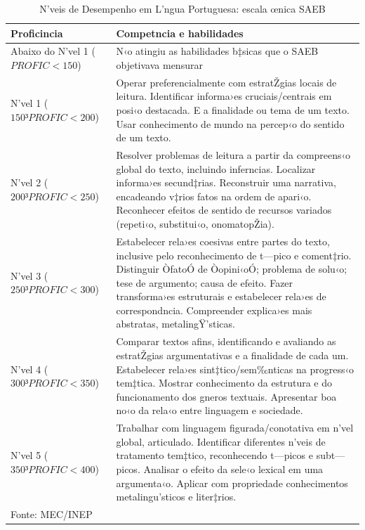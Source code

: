 \documentclass[a4paper, 12pt]{article}
\begin{document}


\begin{table}\centering
\begin{footnotesize}
\def\sym#1{\ifmmode^{#1}\else\(^{#1}\)\fi}
\caption{N’veis de Desempenho em L’ngua Portuguesa: escala œnica SAEB} 
\label{tab: tabsaeb}
\begin{tabular}{p{3cm} | p{9cm}}  
\toprule
\bf{Proficincia}   &  \bf{Competncia e habilidades}  \\
\midrule
\hline
Abaixo do N’vel 1 ($PROFIC < 150$) & N‹o atingiu as habilidades b‡sicas que o SAEB objetivava mensurar \\
\hline
N’vel 1 ($150 ³ PROFIC < 200$) &  Operar preferencialmente com estratŽgias locais de leitura. Identificar informa›es cruciais/centrais em posi‹o destacada. E a finalidade ou tema de um texto. Usar conhecimento de mundo na percep‹o do sentido de um texto. \\
\hline
N’vel 2 ($200 ³ PROFIC < 250$) & Resolver problemas de leitura a partir da compreens‹o global do texto, incluindo inferncias. Localizar informa›es secund‡rias. Reconstruir uma narrativa, encadeando v‡rios fatos na ordem de apari‹o. Reconhecer efeitos de sentido de recursos variados (repeti‹o, substitui‹o, onomatopŽia). \\
\hline
N’vel 3 ($250 ³ PROFIC < 300$) & Estabelecer rela›es coesivas entre partes do texto, inclusive pelo reconhecimento de t—pico e coment‡rio. Distinguir ÒfatoÓ de Òopini‹oÓ; problema de solu‹o; tese de argumento; causa de efeito. Fazer transforma›es estruturais e estabelecer rela›es de correspondncia. Compreender explica›es mais abstratas, metalingŸ’sticas.  \\
\hline
N’vel 4 ($300 ³ PROFIC < 350$) & Comparar textos afins, identificando e avaliando as estratŽgias argumentativas e a finalidade de cada um. Estabelecer rela›es sint‡tico/sem‰nticas na progress‹o tem‡tica. Mostrar conhecimento da estrutura e do funcionamento dos gneros textuais. Apresentar boa no‹o da rela‹o entre linguagem e sociedade. \\
\hline
N’vel 5 ($350 ³ PROFIC < 400$) & Trabalhar com linguagem figurada/conotativa em
n’vel global, articulado. Identificar diferentes n’veis de tratamento tem‡tico, reconhecendo t—picos e subt—picos. Analisar o efeito da sele‹o lexical em uma argumenta‹o. Aplicar com propriedade conhecimentos metalingu’sticos e liter‡rios.  \\
\hline
\bottomrule
\multicolumn{2}{l}{\footnotesize Fonte: MEC/INEP}\\
\end{tabular}
\end{footnotesize}
\end{table}
\end{document}
